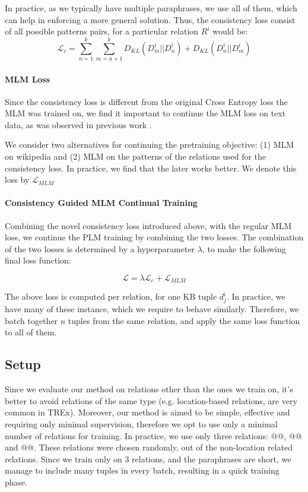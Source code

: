 In practice, as we typically have multiple paraphrases, we use all of them, which can help in enforcing a more general solution. Thus, the consistency loss consist of all possible patterns pairs, for a particular relation $R^i$ would be:
\[
\mathcal{L}_{c} = \sum_{n=1}^k \sum_{m=n+1}^k D_{KL}(D^i_m||D^i_n) + D_{KL}(D^i_n||D^i_m)
\]


\paragraph{MLM Loss}
Since the consistency loss is different from the original Cross Entropy loss the MLM was trained on, we find it important to continue the MLM loss on text data, as was observed in previous work \cite{geva2020injecting}.

We consider two alternatives for continuing the pretraining objective: (1) MLM on wikipedia and (2) MLM on the patterns of the relations used for the consistency loss. In practice, we find that the later works better. We denote this loss by $\mathcal{L}_{MLM}$


\paragraph{Consistency Guided MLM Continual Training}

Combining the novel consistency loss introduced above, with the regular MLM loss, we continue the PLM training by combining the two losses. The combination of the two losses is determined by a hyperparameter $\lambda$, to make the following final loss function:

\[
\mathcal{L} = \lambda \mathcal{L}_c + \mathcal{L}_{MLM}
\]

The above loss is computed per relation, for one KB tuple $d_j^i$. In practice, we have many of these instance, which we require to behave similarly. Therefore, we batch together $n$ tuples from the same relation, and apply the same loss function to all of them.


\subsection{Setup}

Since we evaluate our method on relations other than the ones we train on, it's better to avoid relations of the same type (e.g. location-based relations, are very common in TREx).
Moreover, our method is aimed to be simple, effective and requiring only minimal supervision, therefore we opt to use only a minimal number of relations for training.
In practice, we use only three relations: @@, @@ and @@. These relations were chosen randomly, out of the non-location related relations.
Since we train only on 3 relations, and the paraphrases are short, we manage to include many tuples in every batch, resulting in a quick training phase.

